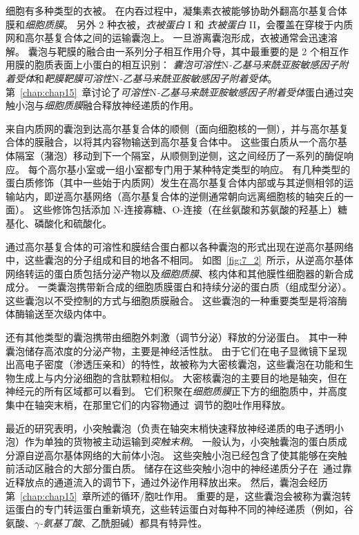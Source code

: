 细胞有多种类型的衣被。
在内吞过程中，凝集素衣被能够协助外翻高尔基复合体膜和\textit{细胞质膜}。
另外 2 种衣被，\textit{衣被蛋白} I 和 \textit{衣被蛋白} II，会覆盖在穿梭于内质网和高尔基复合体之间的运输囊泡上。
一旦游离囊泡形成，衣被通常会迅速溶解。
囊泡与靶膜的融合由一系列分子相互作用介导，其中最重要的是 2 个相互作用膜的胞质表面上小蛋白的相互识别：
\textit{囊泡可溶性}N\textit{-乙基马来酰亚胺敏感因子附着受体}和\textit{靶膜靶膜可溶性}N\textit{-乙基马来酰亚胺敏感因子附着受体}。
第~\ref{chap:chap15}~章讨论了\textit{可溶性}N\textit{-乙基马来酰亚胺敏感因子附着受体}蛋白通过突触小泡与\textit{细胞质膜}融合释放神经递质的作用。


来自内质网的囊泡到达高尔基复合体的顺侧（面向细胞核的一侧），并与高尔基复合体的膜融合，以将其内容物输送到高尔基复合体中。
这些蛋白质从一个高尔基体隔室（潴泡）移动到下一个隔室，从顺侧到逆侧，这之间经历了一系列的酶促响应。
每个高尔基小室或一组小室都专门用于某种特定类型的响应。
有几种类型的蛋白质修饰（其中一些始于内质网）发生在高尔基复合体内部或与其逆侧相邻的运输站内，即逆高尔基网络（高尔基复合体的逆侧通常朝向远离细胞核的轴突丘的一面）。
这些修饰包括添加 N-连接寡糖、O-连接（在丝氨酸和苏氨酸的羟基上）糖基化、磷酸化和硫酸化。


通过高尔基复合体的可溶性和膜结合蛋白都以各种囊泡的形式出现在逆高尔基网络中，这些囊泡的分子组成和目的地各不相同。
如图~\ref{fig:7_2}~所示，从逆高尔基体网络转运的蛋白质包括分泌产物以及\textit{细胞质膜}、核内体和其他膜性细胞器的新合成成分。
一类囊泡携带新合成的细胞质膜蛋白和持续分泌的蛋白质（组成型分泌）。
这些囊泡以不受控制的方式与细胞质膜融合。
这些囊泡的一种重要类型是将溶酶体酶输送至次级内体中。


还有其他类型的囊泡携带由细胞外刺激（调节分泌）释放的分泌蛋白。
其中一种囊泡储存高浓度的分泌产物，主要是神经活性肽。
由于它们在电子显微镜下呈现出高电子密度（渗透压亲和）的特性，故被称为大密核囊泡，这些囊泡在功能和生物生成上与内分泌细胞的含肽颗粒相似。
大密核囊泡的主要目的地是轴突，但在神经元的所有区域都可以看到。
它们积聚在\textit{细胞质膜}正下方的细胞质中，并高度集中在轴突末梢，在那里它们的内容物通过~调节的胞吐作用释放。


最近的研究表明，小突触囊泡（负责在轴突末梢快速释放神经递质的电子透明小泡）作为单独的货物被主动运输到\textit{突触末稍}。
一般认为，小突触囊泡的蛋白质成分源自逆高尔基体网络的大前体小泡。
这些突触小泡已经包含了使其能够在突触前活动区融合的大部分蛋白质。
储存在这些突触小泡中的神经递质分子在~通过靠近释放点的通道流入的调节下，通过外泌作用释放出来。
然后，囊泡会经历第~\ref{chap:chap15}~章所述的循环/胞吐作用。
重要的是，这些囊泡会被称为囊泡转运蛋白的专门转运蛋白重新填充，这些转运蛋白对每种不同的神经递质（例如，谷氨酸、\textit{$\gamma$-氨基丁酸}、乙酰胆碱）都具有特异性。



